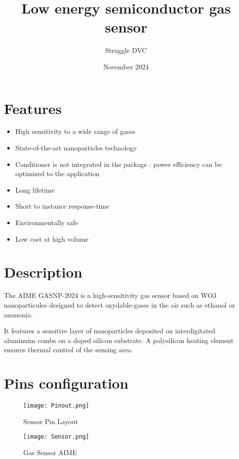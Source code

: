 \documentclass[10pt]{datasheet}
\title{Low energy semiconductor gas sensor}
\author{Struggle DVC}
\date{November 2024}
\begin{document}
\maketitle

\section{Features}

\begin{itemize}
\item{High sensitivity to a wide range of gases}
\item{State-of-the-art nanoparticles technology}
\item{Conditioner is not integrated in the package : power efficiency can be optimized to the application}
\item{Long lifetime}
\item{Short to instance response-time}
\item{Environmentally safe}
\item{Low cost at high volume}
\end{itemize}

\section{Description}
The AIME GASNP-2024 is a high-sensitivity gas sensor based on WO3 nanoparticules designed to detect oxydable-gases in the air such as ethanol or ammonia.

It features a sensitive layer of nanoparticles deposited on interdigitated aluminuim combs on a doped silicon substrate. A polysilicon heating element ensures thermal control of the sensing area.

\section{Pins configuration}


\begin{figure}[htbp]
    \centering
    \texttt{[image: Pinout.png]}
    \centering
    \caption{\centering Sensor Pin Layout}
    \label{fig:enter-label}
\end{figure}

\begin{figure}
    \centering
    \texttt{[image: Sensor.png]}
    \caption{\centering Gas Sensor AIME}
    \label{fig:enter-label}
\end{figure}
\end{document}
